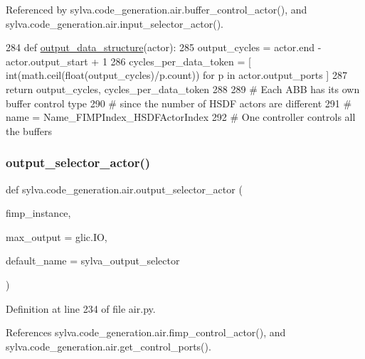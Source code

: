 Referenced by sylva.\+code\+\_\+generation.\+air.\+buffer\+\_\+control\+\_\+actor(), and sylva.\+code\+\_\+generation.\+air.\+input\+\_\+selector\+\_\+actor().


\begin{DoxyCode}
284 \textcolor{keyword}{def }\hyperlink{namespacesylva_1_1code__generation_1_1air_a83186b3b999778cee36ac81d42b2cd44}{output\_data\_structure}(actor):
285   output\_cycles = actor.end - actor.output\_start + 1
286   cycles\_per\_data\_token = [ int(math.ceil(float(output\_cycles)/p.count)) \textcolor{keywordflow}{for} p \textcolor{keywordflow}{in} actor.output\_ports ]
287   \textcolor{keywordflow}{return} output\_cycles, cycles\_per\_data\_token
288 
289 \textcolor{comment}{# Each ABB has its own buffer control type}
290 \textcolor{comment}{# since the number of HSDF actors are different}
291 \textcolor{comment}{# name = Name\_FIMPIndex\_HSDFActorIndex}
292 \textcolor{comment}{# One controller controls all the buffers}
\end{DoxyCode}
\mbox{\label{namespacesylva_1_1code__generation_1_1air_a3e01248fb07a8e940919fe35ddcd684e}} 
\subsubsection{\texorpdfstring{output\+\_\+selector\+\_\+actor()}{output\_selector\_actor()}}
{\footnotesize\ttfamily def sylva.\+code\+\_\+generation.\+air.\+output\+\_\+selector\+\_\+actor (\begin{DoxyParamCaption}\item[{}]{fimp\+\_\+instance,  }\item[{}]{max\+\_\+output = {\ttfamily glic.IO},  }\item[{}]{default\+\_\+name = {\ttfamily \textquotesingle{}sylva\+\_\+output\+\_\+selector\textquotesingle{}} }\end{DoxyParamCaption})}



Definition at line 234 of file air.\+py.



References sylva.\+code\+\_\+generation.\+air.\+fimp\+\_\+control\+\_\+actor(), and sylva.\+code\+\_\+generation.\+air.\+get\+\_\+control\+\_\+ports().



